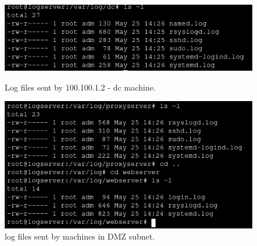 \begin{figure}[H]
\centering
\begin{minipage}{.5\textwidth}
  \centering
  \includegraphics[width=1\textwidth]{logserver_dc.png}
  \caption[a]{Log files sent by 100.100.1.2 - dc machine.}\label{fig:1}
\end{minipage}%
\begin{minipage}{.5\textwidth}
  \centering
  \includegraphics[width=1\textwidth]{logserver_dmz.png}
  \caption[a]{log files sent by machines in DMZ subnet.}\label{fig:2}
\end{minipage}
\end{figure}
